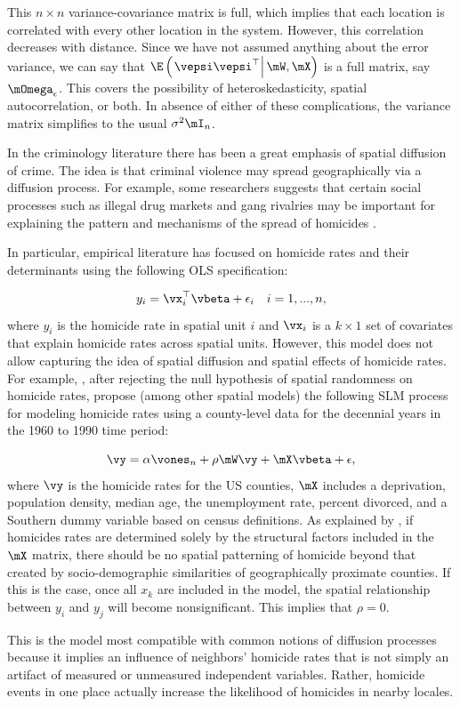 \documentclass[english,12pt]{book}\usepackage[]{graphicx}\usepackage[]{xcolor}
\begin{document}
This $n\times n$ variance-covariance matrix is full, which implies that each location is correlated with every other location in the system. However, this correlation decreases with distance. Since we have not assumed anything about the error variance, we can say that $\E\left(\left.\vepsi\vepsi^\top\right|\mW, \mX\right)$ is a full matrix, say $\mOmega_{\epsilon}$. This covers the possibility of heteroskedasticity, spatial autocorrelation, or both. In absence of either of these complications, the variance matrix simplifies to the usual $\sigma^2\mI_n$.

\begin{example}
In the criminology literature there has been a great emphasis of spatial diffusion of crime. The idea is that criminal violence may spread geographically via a diffusion process. For example, some researchers suggests that certain social processes such as illegal drug markets and gang rivalries may be important for explaining the pattern and mechanisms of the spread of homicides \citep{cohen1999diffusion}. 

In particular, empirical literature has focused on homicide rates and their determinants using the following OLS specification:

\begin{equation*}
y_i = \vx_i^\top\vbeta + \epsilon_i\quad i = 1, ..., n,
\end{equation*}
%
where $y_i$ is the homicide rate in spatial unit $i$ and $\vx_i$ is a $k\times 1$ set of covariates that explain homicide rates across spatial units. However, this model does not allow capturing the idea of spatial diffusion and spatial effects of homicide rates. For example, \cite{baller2001structural}, after rejecting the null hypothesis of spatial randomness on homicide rates, propose (among other spatial models) the following SLM process for modeling homicide rates using a county-level data for the decennial years in the 1960 to 1990 time period:

\begin{equation*}
\vy  =  \alpha \vones_n + \rho \mW\vy + \mX\vbeta + \epsilon,
\end{equation*}
%
where $\vy$ is the homicide rates for the US counties, $\mX$ includes a deprivation, population density, median age, the unemployment rate, percent divorced, and a Southern dummy variable based on census definitions.  As explained by \cite{baller2001structural}, if homicides rates are determined solely by the structural factors included in the $\mX$ matrix, there should be no spatial patterning of homicide beyond that created by socio-demographic similarities of geographically proximate counties. If this is the case, once all $x_k$ are included in the model, the spatial relationship between $y_i$ and $y_j$ will become nonsignificant. This implies that $\rho = 0$.

This is the model most compatible with common notions of diffusion processes because it implies an influence of neighbors’ homicide rates that is not simply an artifact of measured or unmeasured independent variables. Rather, homicide events in one place actually increase the likelihood of homicides in nearby locales. 
\end{example}
\end{document}
